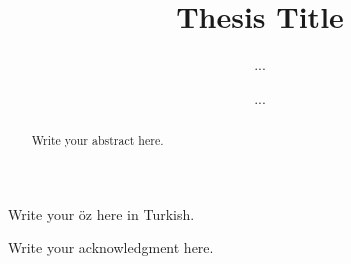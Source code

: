 \documentclass[11pt,oneandhalf,chaparabic]{metu}
\author{...}
\title{Thesis Title}
\date{...}
\begin{document}
\begin{preliminaries}
  \maketitle
  \makeapproval
  \plagiarism
  \setlength{\parindent}{0em}
  \setlength{\parskip}{10pt}
  \begin{abstract}\oneandhalfspacing
	Write your abstract here.
  \end{abstract}
  \begin{oz}\oneandhalfspacing
	Write your \"oz here in Turkish.
  \end{oz}
  \dedication{\textit{Write your dedications here}}
  \setlength{\parindent}{0em}
  \setlength{\parskip}{10pt}
  \begin{acknowledgments}\oneandhalfspacing
	Write your acknowledgment here.
  \end{acknowledgments}
  \setlength{\parindent}{0em}
  \setlength{\parskip}{3pt}
  \tableofcontents

\listoftables

\listoffigures

\end{preliminaries}

\setlength{\parindent}{0em}
\setlength{\parskip}{10pt}



\newpage




\appendix



% 

% 
\end{document}

